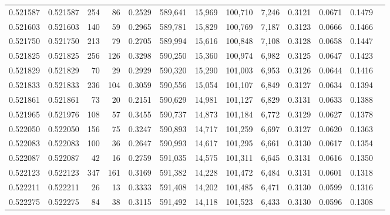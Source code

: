 \begin{tabular}{rrrrrrrrrrrrr}
0.521587 & 0.521587 &   254 &    86 &                                     0.2529 & 589,641 &  15,969 & 100,710 &   7,246 & 0.3121 & 0.0671 & 0.1479 \\
0.521603 & 0.521603 &   140 &    59 &                                     0.2965 & 589,781 &  15,829 & 100,769 &   7,187 & 0.3123 & 0.0666 & 0.1466 \\
0.521750 & 0.521750 &   213 &    79 &                                     0.2705 & 589,994 &  15,616 & 100,848 &   7,108 & 0.3128 & 0.0658 & 0.1447 \\
0.521825 & 0.521825 &   256 &   126 &                                     0.3298 & 590,250 &  15,360 & 100,974 &   6,982 & 0.3125 & 0.0647 & 0.1423 \\
0.521829 & 0.521829 &    70 &    29 &                                     0.2929 & 590,320 &  15,290 & 101,003 &   6,953 & 0.3126 & 0.0644 & 0.1416 \\
0.521833 & 0.521833 &   236 &   104 &                                     0.3059 & 590,556 &  15,054 & 101,107 &   6,849 & 0.3127 & 0.0634 & 0.1394 \\
0.521861 & 0.521861 &    73 &    20 &                                     0.2151 & 590,629 &  14,981 & 101,127 &   6,829 & 0.3131 & 0.0633 & 0.1388 \\
0.521965 & 0.521976 &   108 &    57 &                                     0.3455 & 590,737 &  14,873 & 101,184 &   6,772 & 0.3129 & 0.0627 & 0.1378 \\
0.522050 & 0.522050 &   156 &    75 &                                     0.3247 & 590,893 &  14,717 & 101,259 &   6,697 & 0.3127 & 0.0620 & 0.1363 \\
0.522083 & 0.522083 &   100 &    36 &                                     0.2647 & 590,993 &  14,617 & 101,295 &   6,661 & 0.3130 & 0.0617 & 0.1354 \\
0.522087 & 0.522087 &    42 &    16 &                                     0.2759 & 591,035 &  14,575 & 101,311 &   6,645 & 0.3131 & 0.0616 & 0.1350 \\
0.522123 & 0.522123 &   347 &   161 &                                     0.3169 & 591,382 &  14,228 & 101,472 &   6,484 & 0.3131 & 0.0601 & 0.1318 \\
0.522211 & 0.522211 &    26 &    13 &                                     0.3333 & 591,408 &  14,202 & 101,485 &   6,471 & 0.3130 & 0.0599 & 0.1316 \\
0.522275 & 0.522275 &    84 &    38 &                                     0.3115 & 591,492 &  14,118 & 101,523 &   6,433 & 0.3130 & 0.0596 & 0.1308 \\

\end{tabular}
